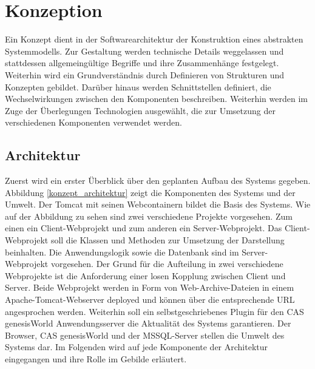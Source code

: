 
\chapter{Konzeption}
\label{ch:Konzeption}

Ein Konzept dient in der Softwarearchitektur der Konstruktion eines abstrakten Systemmodells. Zur Gestaltung werden technische Details weggelassen und stattdessen allgemeingültige Begriffe und ihre Zusammenhänge festgelegt. Weiterhin wird ein Grundverständnis durch Definieren von Strukturen und Konzepten gebildet. Darüber hinaus werden Schnittstellen definiert, die Wechselwirkungen zwischen den Komponenten beschreiben. Weiterhin werden im Zuge der Überlegungen Technologien ausgewählt, die zur Umsetzung der verschiedenen Komponenten verwendet werden.

\section{Architektur}

Zuerst wird ein erster Überblick über den geplanten Aufbau des Systems gegeben. Abbildung \ref{konzept_architektur} zeigt die Komponenten des Systems und der Umwelt. Der Tomcat mit seinen Webcontainern bildet die Basis des Systems. Wie auf der Abbildung zu sehen sind zwei verschiedene Projekte vorgesehen. Zum einen ein Client-Webprojekt und zum anderen ein Server-Webprojekt. Das Client-Webprojekt soll die Klassen und Methoden zur Umsetzung der Darstellung beinhalten. Die Anwendungslogik sowie die Datenbank sind im Server-Webprojekt vorgesehen. Der Grund für die Aufteilung in zwei verschiedene Webprojekte ist die Anforderung einer losen Kopplung zwischen Client und Server. Beide Webprojekt werden in Form von Web-Archive-Dateien in einem Apache-Tomcat-Webserver deployed und können über die entsprechende URL angesprochen werden. Weiterhin soll ein selbstgeschriebenes Plugin für den CAS genesisWorld Anwendungsserver die Aktualität des Systems garantieren. Der Browser, CAS genesisWorld und der MSSQL-Server stellen die Umwelt des Systems dar. Im Folgenden wird auf jede Komponente der Architektur eingegangen und ihre Rolle im Gebilde erläutert.

